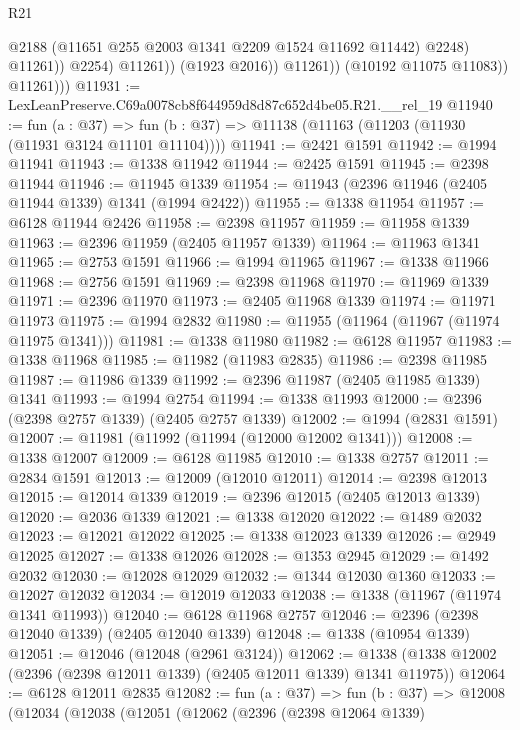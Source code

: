 \begin{lexlean}{R21}
\begin{coremodule}
                              @2188
                              (@11651 @255 @2003 @1341 @2209 @1524 @11692 @11442)
                              @2248)
                            @11261))
                        @2254)
                      @11261))
                  (@1923 @2016))
                @11261))
            (@10192 @11075 @11083))
          @11261)))
@11931 := LexLeanPreserve.C69a0078cb8f644959d8d87c652d4be05.R21.__rel_19
@11940 := fun (a : @37) =>
  fun (b : @37) => @11138 (@11163 (@11203 (@11930 (@11931 @3124 @11101 @11104))))
@11941 := @2421 @1591
@11942 := @1994 @11941
@11943 := @1338 @11942
@11944 := @2425 @1591
@11945 := @2398 @11944
@11946 := @11945 @1339
@11954 := @11943 (@2396 @11946 (@2405 @11944 @1339) @1341 (@1994 @2422))
@11955 := @1338 @11954
@11957 := @6128 @11944 @2426
@11958 := @2398 @11957
@11959 := @11958 @1339
@11963 := @2396 @11959 (@2405 @11957 @1339)
@11964 := @11963 @1341
@11965 := @2753 @1591
@11966 := @1994 @11965
@11967 := @1338 @11966
@11968 := @2756 @1591
@11969 := @2398 @11968
@11970 := @11969 @1339
@11971 := @2396 @11970
@11973 := @2405 @11968 @1339
@11974 := @11971 @11973
@11975 := @1994 @2832
@11980 := @11955 (@11964 (@11967 (@11974 @11975 @1341)))
@11981 := @1338 @11980
@11982 := @6128 @11957
@11983 := @1338 @11968
@11985 := @11982 (@11983 @2835)
@11986 := @2398 @11985
@11987 := @11986 @1339
@11992 := @2396 @11987 (@2405 @11985 @1339) @1341
@11993 := @1994 @2754
@11994 := @1338 @11993
@12000 := @2396 (@2398 @2757 @1339) (@2405 @2757 @1339)
@12002 := @1994 (@2831 @1591)
@12007 := @11981 (@11992 (@11994 (@12000 @12002 @1341)))
@12008 := @1338 @12007
@12009 := @6128 @11985
@12010 := @1338 @2757
@12011 := @2834 @1591
@12013 := @12009 (@12010 @12011)
@12014 := @2398 @12013
@12015 := @12014 @1339
@12019 := @2396 @12015 (@2405 @12013 @1339)
@12020 := @2036 @1339
@12021 := @1338 @12020
@12022 := @1489 @2032
@12023 := @12021 @12022
@12025 := @1338 @12023 @1339
@12026 := @2949 @12025
@12027 := @1338 @12026
@12028 := @1353 @2945
@12029 := @1492 @2032
@12030 := @12028 @12029
@12032 := @1344 @12030 @1360
@12033 := @12027 @12032
@12034 := @12019 @12033
@12038 := @1338 (@11967 (@11974 @1341 @11993))
@12040 := @6128 @11968 @2757
@12046 := @2396 (@2398 @12040 @1339) (@2405 @12040 @1339)
@12048 := @1338 (@10954 @1339)
@12051 := @12046 (@12048 (@2961 @3124))
@12062 := @1338 (@1338 @12002 (@2396 (@2398 @12011 @1339) (@2405 @12011 @1339) @1341 @11975))
@12064 := @6128 @12011 @2835
@12082 := fun (a : @37) =>
  fun (b : @37) =>
  @12008
    (@12034
      (@12038
        (@12051
          (@12062
            (@2396
              (@2398 @12064 @1339)

\end{coremodule}
\end{lexlean}
